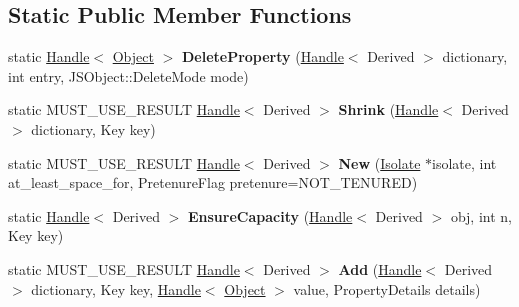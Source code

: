 \subsection*{Static Public Member Functions}
\begin{DoxyCompactItemize}
\item 
\hypertarget{classv8_1_1internal_1_1_dictionary_a6d4544dc2986c581c3f2592e3b4bc36f}{}static \hyperlink{classv8_1_1internal_1_1_handle}{Handle}$<$ \hyperlink{classv8_1_1internal_1_1_object}{Object} $>$ {\bfseries Delete\+Property} (\hyperlink{classv8_1_1internal_1_1_handle}{Handle}$<$ Derived $>$ dictionary, int entry, J\+S\+Object\+::\+Delete\+Mode mode)\label{classv8_1_1internal_1_1_dictionary_a6d4544dc2986c581c3f2592e3b4bc36f}

\item 
\hypertarget{classv8_1_1internal_1_1_dictionary_aae05e9e26a511fba0d89a0d83d801b4d}{}static M\+U\+S\+T\+\_\+\+U\+S\+E\+\_\+\+R\+E\+S\+U\+L\+T \hyperlink{classv8_1_1internal_1_1_handle}{Handle}$<$ Derived $>$ {\bfseries Shrink} (\hyperlink{classv8_1_1internal_1_1_handle}{Handle}$<$ Derived $>$ dictionary, Key key)\label{classv8_1_1internal_1_1_dictionary_aae05e9e26a511fba0d89a0d83d801b4d}

\item 
\hypertarget{classv8_1_1internal_1_1_dictionary_a1e58e4d3d15a70c2065fac79b8bff262}{}static M\+U\+S\+T\+\_\+\+U\+S\+E\+\_\+\+R\+E\+S\+U\+L\+T \hyperlink{classv8_1_1internal_1_1_handle}{Handle}$<$ Derived $>$ {\bfseries New} (\hyperlink{classv8_1_1internal_1_1_isolate}{Isolate} $\ast$isolate, int at\+\_\+least\+\_\+space\+\_\+for, Pretenure\+Flag pretenure=N\+O\+T\+\_\+\+T\+E\+N\+U\+R\+E\+D)\label{classv8_1_1internal_1_1_dictionary_a1e58e4d3d15a70c2065fac79b8bff262}

\item 
\hypertarget{classv8_1_1internal_1_1_dictionary_a3278fe262a0a67f04c43fdca7079b288}{}static \hyperlink{classv8_1_1internal_1_1_handle}{Handle}$<$ Derived $>$ {\bfseries Ensure\+Capacity} (\hyperlink{classv8_1_1internal_1_1_handle}{Handle}$<$ Derived $>$ obj, int n, Key key)\label{classv8_1_1internal_1_1_dictionary_a3278fe262a0a67f04c43fdca7079b288}

\item 
\hypertarget{classv8_1_1internal_1_1_dictionary_a6888a0be89612ae10da310bae830517d}{}static M\+U\+S\+T\+\_\+\+U\+S\+E\+\_\+\+R\+E\+S\+U\+L\+T \hyperlink{classv8_1_1internal_1_1_handle}{Handle}$<$ Derived $>$ {\bfseries Add} (\hyperlink{classv8_1_1internal_1_1_handle}{Handle}$<$ Derived $>$ dictionary, Key key, \hyperlink{classv8_1_1internal_1_1_handle}{Handle}$<$ \hyperlink{classv8_1_1internal_1_1_object}{Object} $>$ value, Property\+Details details)\label{classv8_1_1internal_1_1_dictionary_a6888a0be89612ae10da310bae830517d}

\end{DoxyCompactItemize}
